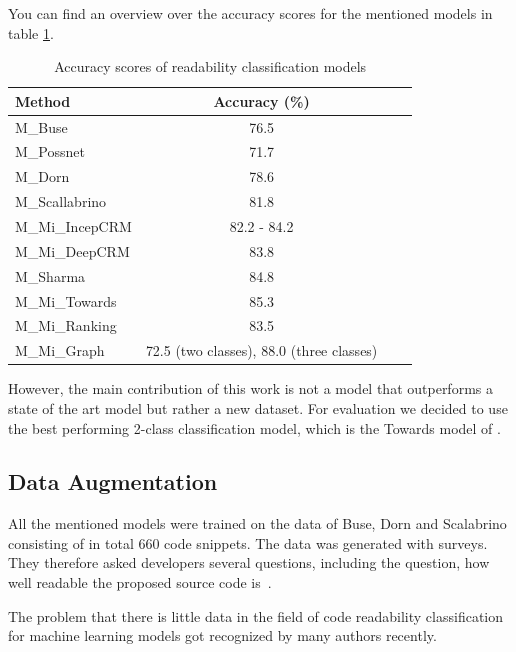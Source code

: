 \documentclass[%
class=scrreprt,
chapterprefix=false,%
open=right,%
twoside=false,%
paper=a4,%
logofile={Logo\_zentral\_farbig\_EN.png},%
thesistype=master,%
UKenglish,%
]{se2thesis}
\begin{document}
	You can find an overview over the accuracy scores for the mentioned models in table \ref{tab:rel-acc-scores}.
	\begin{table}[ht]
		\centering
		\begin{tabular}{lccc}
			\toprule
			\textbf{Method} & \textbf{Accuracy (\%)} \\
			\midrule
			M\_Buse \cite{buse2009learning} & 76.5 \\
			M\_Possnet \cite{posnett2011simpler} & 71.7 \\
			M\_Dorn \cite{dorn2012general} & 78.6 \\
			M\_Scallabrino \cite{scalabrino2016improving} & 81.8 \\
			M\_Mi\_IncepCRM \cite{mi2018inception} & 82.2 - 84.2 \\
			M\_Mi\_DeepCRM \cite{mi2018improving} & 83.8 \\
			M\_Sharma \cite{sharma2020egan} & 84.8 \\
			M\_Mi\_Towards \cite{mi2022towards} & 85.3 \\
			M\_Mi\_Ranking \cite{mi2022rank} & 83.5 \\
			M\_Mi\_Graph \cite{mi2023graph} & 72.5 (two classes), 88.0 (three classes) \\
			\bottomrule
		\end{tabular}
		\caption{Accuracy scores of readability classification models}
		\label{tab:rel-acc-scores}
	\end{table}
	
	However, the main contribution of this work is not a model that outperforms a state of the art model but rather a new dataset. For evaluation we decided to use the best performing 2-class classification model, which is the Towards model of \citeauthor{mi2022towards}.
			
\subsection{Data Augmentation} \label{Data Augmentation}

	All the mentioned models were trained on the data of Buse, Dorn and Scalabrino consisting of in total 660 code snippets. The data was generated with surveys. They therefore asked developers several questions, including the question, how well readable the proposed source code is~\cite{buse2009learning, dorn2012general, scalabrino2018comprehensive}.
	
	The problem that there is little data in the field of code readability classification for machine learning models got recognized by many authors recently.
	
\end{document}
